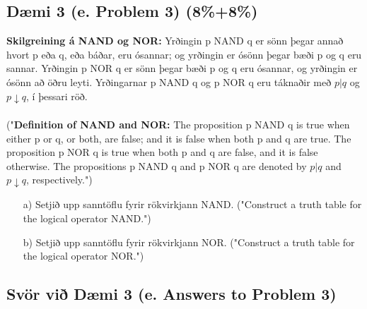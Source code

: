 \newpage
\subsection*{Dæmi 3 (e. Problem 3) (8\%+8\%)\label{section:daemi3}}
\textbf{Skilgreining á NAND og NOR:} Yrðingin p NAND q er sönn þegar annað hvort p eða q, eða báðar, eru ósannar; og yrðingin er ósönn þegar bæði p og q eru sannar. Yrðingin p NOR q er sönn þegar bæði p og q eru ósannar, og yrðingin er ósönn að öðru leyti. Yrðingarnar p NAND q og p NOR q eru táknaðir með $p | q$ og $p \downarrow q$, í þessari röð. \\ \\
("\textbf{Definition of NAND and NOR:} The proposition p NAND q is true when either p or q, or both, are false; and it is false when both p and q are true. The proposition p NOR q is true when both p and q are false, and it is false otherwise. The propositions p NAND q and p NOR q are denoted by $p | q$ and $p \downarrow q$, respectively.")

\begin{itemize}
    \item[a)] Setjið upp sanntöflu fyrir rökvirkjann NAND. ("Construct a truth table for the logical operator NAND.")
    \item[b)] Setjið upp sanntöflu fyrir rökvirkjann NOR. ("Construct a truth table for the logical operator NOR.")
\end{itemize}

\subsection*{Svör við Dæmi 3 (e. Answers to Problem 3)}

